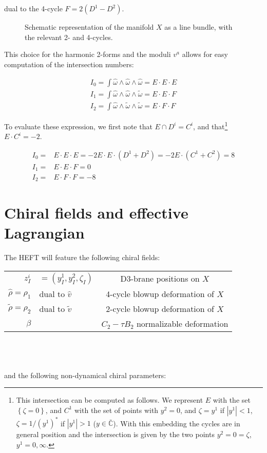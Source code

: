 dual to the 4-cycle $F = 2 (D^1 - D^2)$.\\

\begin{figure}
\centering
\def\svgwidth{100pt}
\captionsetup{width=0.8\textwidth}

\caption{Schematic representation of the manifold $X$ as a line bundle, with the relevant 2- and 4-cycles.}
\end{figure}

This choice for the harmonic 2-forms and the moduli $v^a$ allows for easy computation of the intersection numbers:

\begin{align}
	I_0 = \int \hat\omega \wedge \hat\omega \wedge \hat\omega = E \cdot E \cdot E \\
	I_1 = \int \hat\omega \wedge \hat\omega \wedge \tilde\omega = E \cdot E \cdot F \\
	I_2 = \int \hat\omega \wedge \tilde\omega \wedge \tilde\omega = E \cdot F \cdot F
	\label{}
\end{align}

To evaluate these expression, we first note that $E \cap D^i = C^i$, and that\footnote{This intersection can be computed as follows. We represent $E$ with the set $\left\{ \zeta = 0 \right\}$, and $C^1$ with the set of points with $y^2=0$, and $\zeta = y^1$ if $|y^1|<1$, $\zeta = 1/(y^1)^*$ if $|y^1|>1$ ($y\in \bar{\mathbb{C}}$). With this embedding the cycles are in general position and the intersection is given by the two points $y^2=0=\zeta$, $y^1 = 0,\infty$.} $E \cdot C^i = -2$. 

\begin{align}
	I_0 =& E \cdot E \cdot E = - 2 E \cdot E \cdot (D^1 + D^2) = - 2 E \cdot(C^1+C^2) = 8\\
	I_1  =& E \cdot E \cdot F = 0\\
	I_2 =& E \cdot F \cdot F = -8
	\label{}
\end{align}

\section{Chiral fields and effective Lagrangian}

The HEFT will feature the following chiral fields:\\

\begin{tabular}{r | l c}
	$z_I^i$ & $= (y_I^1, y_I^2, \zeta_I)$ & D3-brane positions on $X$\\
	$\hat\rho = \rho_1$ & dual to $\hat v$ & 4-cycle blowup deformation of $X$\\
	$\tilde\rho = \rho_2$ & dual to $\tilde v$ & 2-cycle blowup deformation of $X$\\
	$\beta$ &  & $C_2 - \tau B_2$ normalizable deformation
\end{tabular}\\
~\\
~\\
and the following non-dynamical chiral parameters:

